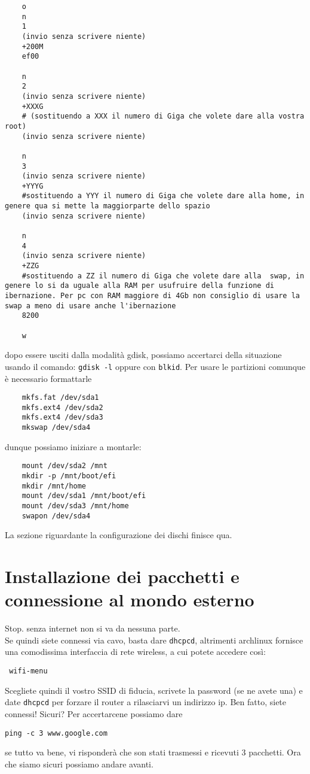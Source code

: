 \documentclass[twoside,italian]{book}
\newcommand{\code}[1]{\texttt{#1}}
\newcommand{\centcode}[1]{

\definecolor{codice}{rgb}{0.5,0.1,0.1}

	\begin{center}
		\color{codice}
		\code{#1}
	\end{center}


}
\begin{document}
\begin{lstlisting}
	o
	n
	1
	(invio senza scrivere niente)
	+200M
	ef00

	n
	2
	(invio senza scrivere niente)
	+XXXG
	# (sostituendo a XXX il numero di Giga che volete dare alla vostra root)
	(invio senza scrivere niente)

	n
	3
	(invio senza scrivere niente)
	+YYYG
	#sostituendo a YYY il numero di Giga che volete dare alla home, in genere qua si mette la maggiorparte dello spazio
	(invio senza scrivere niente)

	n
	4
	(invio senza scrivere niente)
	+ZZG
	#sostituendo a ZZ il numero di Giga che volete dare alla  swap, in genere lo si da uguale alla RAM per usufruire della funzione di ibernazione. Per pc con RAM maggiore di 4Gb non consiglio di usare la swap a meno di usare anche l'ibernazione
	8200

	w
\end{lstlisting}



			dopo essere usciti dalla modalità gdisk, possiamo accertarci della situazione usando il comando: \code{gdisk -l} oppure con \code{blkid}.
			Per usare le partizioni comunque è necessario formattarle\\


\begin{lstlisting}
	mkfs.fat /dev/sda1
	mkfs.ext4 /dev/sda2
	mkfs.ext4 /dev/sda3
	mkswap /dev/sda4
\end{lstlisting}



			dunque possiamo iniziare a montarle:


\begin{lstlisting}
	mount /dev/sda2 /mnt
	mkdir -p /mnt/boot/efi
	mkdir /mnt/home
	mount /dev/sda1 /mnt/boot/efi
	mount /dev/sda3 /mnt/home
	swapon /dev/sda4
\end{lstlisting}



			La sezione riguardante la configurazione dei dischi finisce qua.

		\section{Installazione dei pacchetti e connessione al mondo esterno}

			Stop. senza internet non si va da nessuna parte.\\

			Se quindi siete connessi via cavo, basta dare \code{dhcpcd}, altrimenti archlinux fornisce una comodissima interfaccia di rete wireless, a cui potete accedere così: \centcode{
				wifi-menu
			} Scegliete quindi il vostro SSID di fiducia, scrivete la password (se ne avete una) e date \code{dhcpcd} per forzare il router a rilasciarvi un indirizzo ip. Ben fatto, siete connessi! Sicuri? Per accertarcene possiamo dare \centcode{ping -c 3 www.google.com} se tutto va bene, vi risponderà che son stati trasmessi e ricevuti 3 pacchetti. Ora che siamo sicuri possiamo andare avanti.\\
\end{document}
